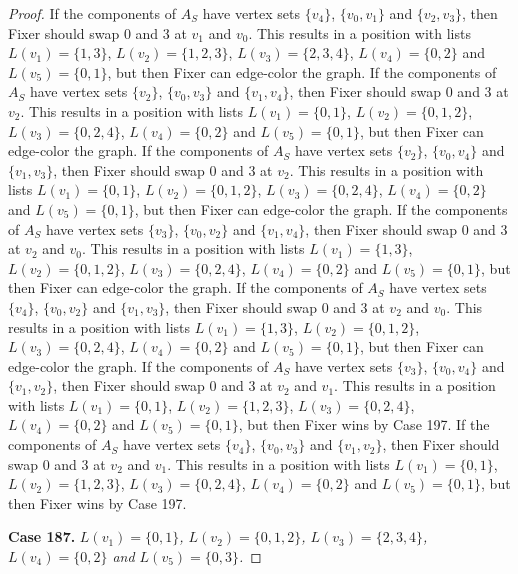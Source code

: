 \documentclass[12pt]{amsart}
\theoremstyle{plain}
\theoremstyle{definition}
\theoremstyle{remark}
\begin{document}
\begin{proof}
If the components of $A_S$ have vertex sets $\{v_4\}$, $\{v_0, v_1\}$ and $\{v_2, v_3\}$, then Fixer should swap 0 and 3 at $v_1$ and $v_0$. This results in a position with lists $L(v_1) = \{1, 3\}$, $L(v_2) = \{1, 2, 3\}$, $L(v_3) = \{2, 3, 4\}$, $L(v_4) = \{0, 2\}$ and $L(v_5) = \{0, 1\}$, but then Fixer can edge-color the graph.
If the components of $A_S$ have vertex sets $\{v_2\}$, $\{v_0, v_3\}$ and $\{v_1, v_4\}$, then Fixer should swap 0 and 3 at $v_2$. This results in a position with lists $L(v_1) = \{0, 1\}$, $L(v_2) = \{0, 1, 2\}$, $L(v_3) = \{0, 2, 4\}$, $L(v_4) = \{0, 2\}$ and $L(v_5) = \{0, 1\}$, but then Fixer can edge-color the graph.
If the components of $A_S$ have vertex sets $\{v_2\}$, $\{v_0, v_4\}$ and $\{v_1, v_3\}$, then Fixer should swap 0 and 3 at $v_2$. This results in a position with lists $L(v_1) = \{0, 1\}$, $L(v_2) = \{0, 1, 2\}$, $L(v_3) = \{0, 2, 4\}$, $L(v_4) = \{0, 2\}$ and $L(v_5) = \{0, 1\}$, but then Fixer can edge-color the graph.
If the components of $A_S$ have vertex sets $\{v_3\}$, $\{v_0, v_2\}$ and $\{v_1, v_4\}$, then Fixer should swap 0 and 3 at $v_2$ and $v_0$. This results in a position with lists $L(v_1) = \{1, 3\}$, $L(v_2) = \{0, 1, 2\}$, $L(v_3) = \{0, 2, 4\}$, $L(v_4) = \{0, 2\}$ and $L(v_5) = \{0, 1\}$, but then Fixer can edge-color the graph.
If the components of $A_S$ have vertex sets $\{v_4\}$, $\{v_0, v_2\}$ and $\{v_1, v_3\}$, then Fixer should swap 0 and 3 at $v_2$ and $v_0$. This results in a position with lists $L(v_1) = \{1, 3\}$, $L(v_2) = \{0, 1, 2\}$, $L(v_3) = \{0, 2, 4\}$, $L(v_4) = \{0, 2\}$ and $L(v_5) = \{0, 1\}$, but then Fixer can edge-color the graph.
If the components of $A_S$ have vertex sets $\{v_3\}$, $\{v_0, v_4\}$ and $\{v_1, v_2\}$, then Fixer should swap 0 and 3 at $v_2$ and $v_1$. This results in a position with lists $L(v_1) = \{0, 1\}$, $L(v_2) = \{1, 2, 3\}$, $L(v_3) = \{0, 2, 4\}$, $L(v_4) = \{0, 2\}$ and $L(v_5) = \{0, 1\}$, but then Fixer wins by Case 197.
If the components of $A_S$ have vertex sets $\{v_4\}$, $\{v_0, v_3\}$ and $\{v_1, v_2\}$, then Fixer should swap 0 and 3 at $v_2$ and $v_1$. This results in a position with lists $L(v_1) = \{0, 1\}$, $L(v_2) = \{1, 2, 3\}$, $L(v_3) = \{0, 2, 4\}$, $L(v_4) = \{0, 2\}$ and $L(v_5) = \{0, 1\}$, but then Fixer wins by Case 197.

\noindent\textbf{Case 187.  }\textit{$L(v_1) = \{0, 1\}$, $L(v_2) = \{0, 1, 2\}$, $L(v_3) = \{2, 3, 4\}$, $L(v_4) = \{0, 2\}$ and $L(v_5) = \{0, 3\}$.}


\end{proof}
\end{document}

